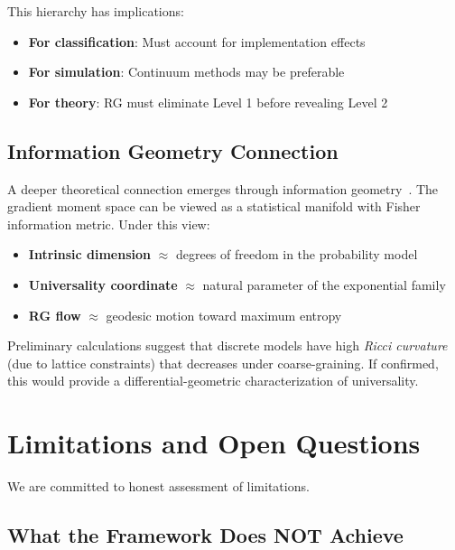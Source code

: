 \documentclass[aps,pre,twocolumn,superscriptaddress,showpacs,longbibliography]{revtex4-2}
\begin{document}
This hierarchy has implications:
\begin{itemize}
\item \textbf{For classification}: Must account for implementation effects
\item \textbf{For simulation}: Continuum methods may be preferable
\item \textbf{For theory}: RG must eliminate Level 1 before revealing Level 2
\end{itemize}

\subsection{Information Geometry Connection}

A deeper theoretical connection emerges through information geometry~\cite{Amari2016}. The gradient moment space can be viewed as a statistical manifold with Fisher information metric. Under this view:

\begin{itemize}
\item \textbf{Intrinsic dimension} $\approx$ degrees of freedom in the probability model
\item \textbf{Universality coordinate} $\approx$ natural parameter of the exponential family
\item \textbf{RG flow} $\approx$ geodesic motion toward maximum entropy
\end{itemize}

Preliminary calculations suggest that discrete models have high \emph{Ricci curvature} (due to lattice constraints) that decreases under coarse-graining. If confirmed, this would provide a differential-geometric characterization of universality.

\section{Limitations and Open Questions}
\label{sec:limitations}

We are committed to honest assessment of limitations.

\subsection{What the Framework Does NOT Achieve}
\end{document}
